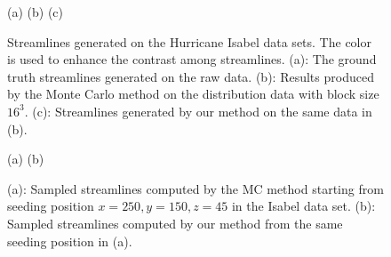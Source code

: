 \begin{figure}[!htbp]
  \centering
  \small
  (a)  \hfill
  (b)  \hfill
  (c) 

  \caption{Streamlines generated on the Hurricane Isabel data sets. The color is used to enhance the contrast among streamlines. (a): The ground truth streamlines generated on the raw data. (b): Results produced by the Monte Carlo method on the distribution data with block size $16^3$. (c): Streamlines generated by our method on the same data in (b).}
  \label{data_overview}
\end{figure}

\begin{figure}[!htbp]
  \centering
  \small
  (a)  \hfill
  (b) 
  \caption{(a): Sampled streamlines computed by the MC method starting from seeding position $x=250, y=150, z=45$ in the Isabel data set. (b): Sampled streamlines computed by our method from the same seeding position in (a).}
  \label{case_4}
\end{figure}

